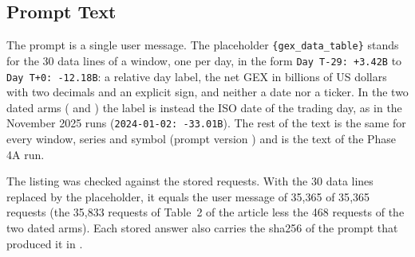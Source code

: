 \subsection{Prompt Text}
\label{app:prompt:body}

The prompt is a single user message. The placeholder \texttt{\{gex\_data\_table\}} stands for the 30 data lines of a window, one per day, in the form \texttt{Day T-29: +3.42B} to \texttt{Day T+0: -12.18B}: a relative day label, the net GEX in billions of US dollars with two decimals and an explicit sign, and neither a date nor a ticker. In the two dated arms ( and ) the label is instead the ISO date of the trading day, as in the November 2025 runs (\texttt{2024-01-02: -33.01B}). The rest of the text is the same for every window, series and symbol (prompt version ) and is the text of the Phase 4A run.

The listing was checked against the stored requests. With the 30 data lines replaced by the placeholder, it equals the user message of 35{,}365 of 35{,}365 requests (the 35{,}833 requests of Table~2 of the article less the 468 requests of the two dated arms). Each stored answer also carries the sha256 of the prompt that produced it in .

